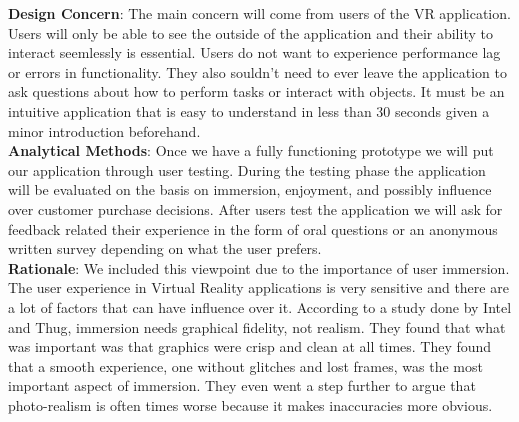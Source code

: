 \documentclass[10pt,journal,compsoc,onecolumn, draftclsnofoot]{IEEEtran}
\begin{document}
\hangindent=0.5cm \textbf{Design Concern}: The main concern will come from users of the VR application. Users will only be able to see the outside of the application and their ability to interact seemlessly is essential. Users do not want to experience performance lag or errors in functionality. They also souldn't need to ever leave the application to ask questions about how to perform tasks or interact with objects. It must be an intuitive application that is easy to understand in less than 30 seconds given a minor introduction beforehand. \\

\hangindent=0.5cm \textbf{Analytical Methods}: Once we have a fully functioning prototype we will put our application through user testing. During the testing phase the application will be evaluated on the basis on immersion, enjoyment, and possibly influence over customer purchase decisions. After users test the application we will ask for feedback related their experience in the form of oral questions or an anonymous written survey depending on what the user prefers. \\

\hangindent=0.5cm \textbf{Rationale}: We included this viewpoint due to the importance of user immersion. The user experience in Virtual Reality applications is very sensitive and there are a lot of factors that can have influence over it. According to a study done by Intel and Thug\cite{michalak_lind_round1}, immersion needs graphical fidelity, not realism. They found that what was important was that graphics were crisp and clean at all times. They found that a smooth experience, one without glitches and lost frames, was the most important aspect of immersion. They even went a step further to argue that photo-realism is often times worse because it makes inaccuracies more obvious. \\
\end{document}
